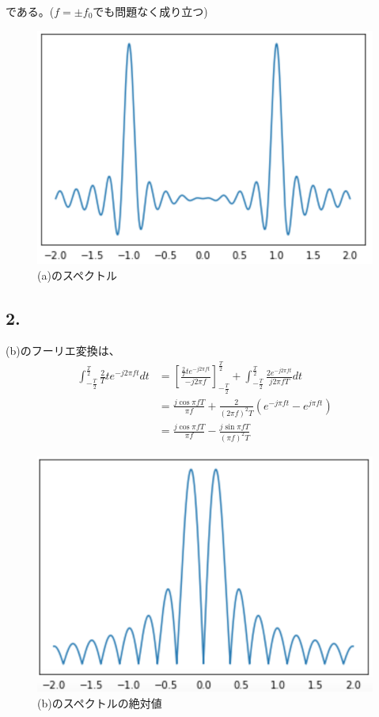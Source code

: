\documentclass[dvipdfmx]{jsarticle}
\begin{document}
である。($f=\pm f_{0}$でも問題なく成り立つ)
\begin{center}
\begin{figure}[H]
\includegraphics[scale = 1]{2_1.png}
\caption{(a)のスペクトル}
\end{figure}
\end{center}

\subsection*{2.}

(b)のフーリエ変換は、
\begin{align*}
\int _{-\frac{T}{2}} ^{\frac{T}{2}} \frac{2}{T} t e^{-j2\pi ft}dt &=\left[ \frac{\frac{2}{T}te^{-j2\pi f t}}{-j2\pi f}\right]^{\frac{T}{2}}_{-\frac{T}{2}} + \int ^{\frac{T}{2}} _{-\frac{T}{2}} \frac{2e^{-j2\pi ft}}{j2\pi fT}dt\\
&=\frac{j\cos{\pi fT}}{\pi f} + \frac{2}{(2\pi f)^{2}T}\left( e^{-j\pi ft} - e^{j\pi ft}\right)\\
&=\frac{j\cos{\pi fT}}{\pi f} - \frac{j\sin{\pi fT}}{(\pi f)^{2}T}
\end{align*}
\begin{center}
\begin{figure}[H]
\includegraphics[scale = 1]{2_2.png}
\caption{(b)のスペクトルの絶対値}
\end{figure}
\end{center}
\end{document}
